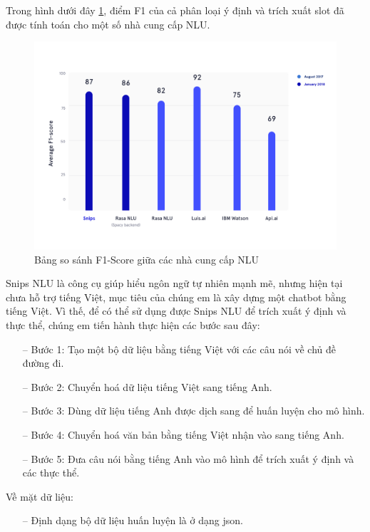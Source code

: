 Trong hình dưới đây \ref{fig:benchmarks}, điểm F1 của cả phân loại ý định và trích xuất slot đã được tính toán cho một số nhà cung cấp NLU.

\begin{figure}[htp]
    \centering
    \includegraphics[width=15cm]{images/benchmarks.png}
    \caption{Bảng so sánh F1-Score giữa các nhà cung cấp NLU}
    \label{fig:benchmarks}
\end{figure}

Snips NLU là công cụ giúp hiểu ngôn ngữ tự nhiên mạnh mẽ, nhưng hiện tại chưa hỗ trợ tiếng Việt, mục tiêu của chúng em là xây dựng một chatbot bằng tiếng Việt. Vì thế, để có thể sử dụng được Snips NLU để trích xuất ý định và thực thể, chúng em tiến hành thực hiện các bước sau đây:
\begin{itemize}
    \item[--] Bước 1: Tạo một bộ dữ liệu bằng tiếng Việt với các câu nói về chủ đề đường đi.
    \item[--] Bước 2: Chuyển hoá dữ liệu tiếng Việt sang tiếng Anh.
    \item[--] Bước 3: Dùng dữ liệu tiếng Anh được dịch sang để huấn luyện cho mô hình.
    \item[--] Bước 4: Chuyển hoá văn bản bằng tiếng Việt nhận vào sang tiếng Anh.
    \item[--] Bước 5: Đưa câu nói bằng tiếng Anh vào mô hình để trích xuất ý định và các thực thể.
\end{itemize}

Về mặt dữ liệu:
\begin{itemize}
    \item[--] Định dạng bộ dữ liệu huấn luyện là ở dạng json.
\end{itemize}

